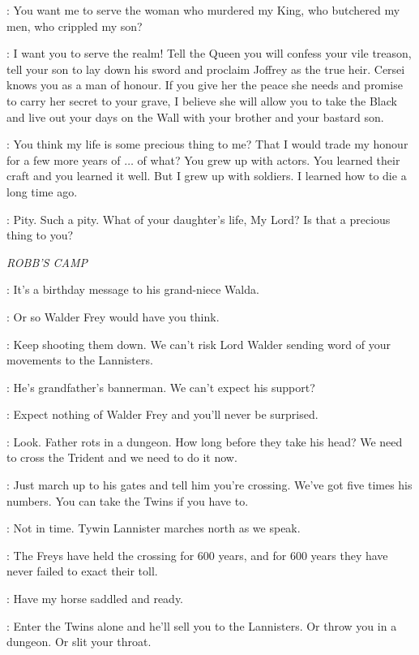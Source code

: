 \NED: You want me to serve the woman who murdered my King, who butchered my men, who crippled my son? 

\VARYS: I want you to serve the realm! Tell the Queen you will confess your vile treason, tell your son to lay down his sword and proclaim Joffrey as the true heir. Cersei knows you as a man of honour. If you give her the peace she needs and promise to carry her secret to your grave, I believe she will allow you to take the Black and live out your days on the Wall with your brother and your bastard son. 

\NED: You think my life is some precious thing to me? That I would trade my honour for a few more years of $\ldots$ of what? You grew up with actors. You learned their craft and you learned it well. But I grew up with soldiers. I learned how to die a long time ago. 

\VARYS: Pity. Such a pity. What of your daughter's life, My Lord? Is that a precious thing to you? 


\scene

\textit{ROBB'S CAMP} 


\ROBB: It's a birthday message to his grand-niece Walda. 

\THEON: Or so Walder Frey would have you think. 

\CATELYN: Keep shooting them down. We can't risk Lord Walder sending word of your movements to the Lannisters. 

\ROBB: He's grandfather's bannerman. We can't expect his support? 

\UMBER: Expect nothing of Walder Frey and you'll never be surprised. 

\ROBB: Look. Father rots in a dungeon. How long before they take his head? We need to cross the Trident and we need to do it now. 

\THEON: Just march up to his gates and tell him you're crossing. We've got five times his numbers. You can take the Twins if you have to. 

\UMBER: Not in time. Tywin Lannister marches north as we speak. 

\CATELYN: The Freys have held the crossing for 600 years, and for 600 years they have never failed to exact their toll. 

\ROBB: Have my horse saddled and ready. 

\UMBER: Enter the Twins alone and he'll sell you to the Lannisters. Or throw you in a dungeon. Or slit your throat. 

